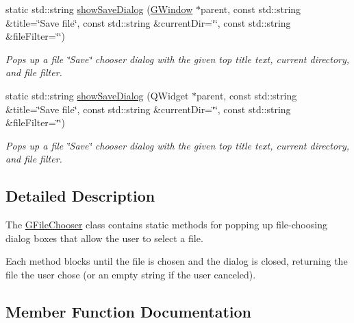 \begin{DoxyCompactItemize}
static std\+::string \mbox{\hyperlink{classsgl_1_1GFileChooser_ab1c47de23b7cb122ab4edc94ba672c47}{show\+Save\+Dialog}} (\mbox{\hyperlink{classsgl_1_1GWindow}{G\+Window}} $\ast$parent, const std\+::string \&title=\char`\"{}Save file\char`\"{}, const std\+::string \&current\+Dir=\char`\"{}\char`\"{}, const std\+::string \&file\+Filter=\char`\"{}\char`\"{})
\begin{DoxyCompactList}\small\item\em Pops up a file \char`\"{}\+Save\char`\"{} chooser dialog with the given top title text, current directory, and file filter. \end{DoxyCompactList}\item 
static std\+::string \mbox{\hyperlink{classsgl_1_1GFileChooser_a0207a9ef46bffc79e6cebaba47c2f493}{show\+Save\+Dialog}} (Q\+Widget $\ast$parent, const std\+::string \&title=\char`\"{}Save file\char`\"{}, const std\+::string \&current\+Dir=\char`\"{}\char`\"{}, const std\+::string \&file\+Filter=\char`\"{}\char`\"{})
\begin{DoxyCompactList}\small\item\em Pops up a file \char`\"{}\+Save\char`\"{} chooser dialog with the given top title text, current directory, and file filter. \end{DoxyCompactList}\end{DoxyCompactItemize}


\subsection{Detailed Description}
The \mbox{\hyperlink{classsgl_1_1GFileChooser}{G\+File\+Chooser}} class contains static methods for popping up file-\/choosing dialog boxes that allow the user to select a file. 

Each method blocks until the file is chosen and the dialog is closed, returning the file the user chose (or an empty string if the user canceled). 

\subsection{Member Function Documentation}
\mbox{\label{classsgl_1_1GFileChooser_abe21d73a151b976a4f639005b9652407}} 
